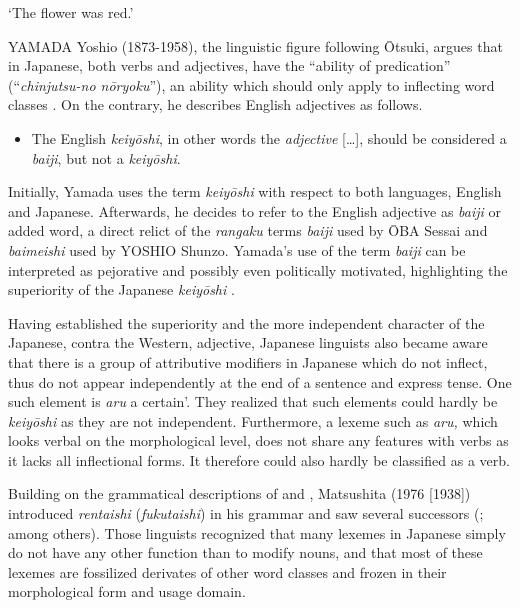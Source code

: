 \documentclass[output=paper]{langscibook}
\begin{document}
\begin{styleBeispielCinqueKapitel}
‘The flower was red.’ 
\end{styleBeispielCinqueKapitel}

YAMADA Yoshio (1873-1958), the linguistic figure following Ōtsuki, argues that in Japanese, both verbs and adjectives, have the “ability of predication”\textbf{ }(“\textit{chinjutsu-no nōryoku}”), an ability which should only apply to inflecting word classes \citep[861]{Yamada1908}. On the contrary, he describes English adjectives as follows.

\begin{itemize}
\item \begin{styleBeispielCinqueKapitel}
The English \textit{keiyōshi}, in other words the \textit{adjective} […], should be considered a \textit{baiji}, but not a \textit{keiyōshi}. \citep[869]{Yamada1908}
\end{styleBeispielCinqueKapitel}
\end{itemize}

Initially, Yamada uses the term \textit{keiyōshi} with respect to both languages, English and Japanese. Afterwards, he decides to refer to the English adjective as \textit{baiji} or {\textasciigrave}added word, a direct relict of the \textit{rangaku} terms \textit{baiji} used by ŌBA Sessai and \textit{baimeishi} used by YOSHIO Shunzo. Yamada’s use of the term \textit{baiji} can be interpreted as pejorative and possibly even politically motivated, highlighting the superiority of the Japanese \textit{keiyōshi} \citep{Kim2006}.

Having established the superiority and the more independent character of the Japanese, contra the Western, adjective, Japanese linguists also became aware that there is a group of attributive modifiers in Japanese which do not inflect, thus do not appear independently at the end of a sentence and express tense. One such element is \textit{aru} {\textasciigrave}a certain’. They realized that such elements could hardly be \textit{keiyōshi} as they are not independent. Furthermore, a lexeme such as \textit{aru,} which looks verbal on the morphological level, does not share any features with verbs as it lacks all inflectional forms. It therefore could also hardly be classified as a verb. 

Building on the grammatical descriptions of \citet{Ōtsuki1891} and \citet{Yamada1908}, Matsushita (1976 [1938]) introduced \textit{rentaishi} (\textit{fukutaishi}) in his grammar and saw several successors (\citealt{Sekine1937}; \citealt{Kieda1938} among others). Those linguists recognized that many lexemes in Japanese simply do not have any other function than to modify nouns, and that most of these lexemes are fossilized derivates of other word classes and frozen in their morphological form and usage domain.
\end{document}
